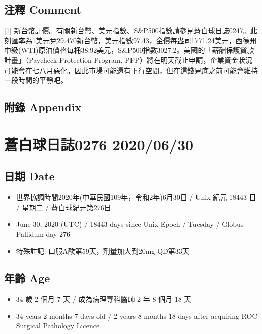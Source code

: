 \documentclass[a5paper, 11pt
]{book}
\providecommand{\tightlist}{%
  \setlength{\itemsep}{0pt}\setlength{\parskip}{0pt}}
\begin{document}
\hypertarget{ux6ce8ux91cb-comment-28}{%
\subsection{注釋 Comment}\label{ux6ce8ux91cb-comment-28}}

{[}1{]}
新台幣計價。有關新台幣、美元指數、S\&P500指數請參見蒼白球日誌0247。此刻匯率為1美元兌29.470新台幣，美元指數97.43，金價每盎司1771.24美元，西德州中級(WTI)原油價格每桶38.92美元，S\&P500指數3027.2。美國的「薪酬保護貸款計畫」（Paycheck
Protection Program,
PPP）將在明天截止申請，企業資金狀況可能會在七八月惡化，因此市場可能還有下行空間，但在這錢見底之前可能會維持一段時間的平靜吧。

\hypertarget{ux9644ux9304-appendix-28}{%
\subsection{附錄 Appendix}\label{ux9644ux9304-appendix-28}}

\hypertarget{ux84bcux767dux7403ux65e5ux8a8c0276-20200630}{%
\section{蒼白球日誌0276
2020/06/30}\label{ux84bcux767dux7403ux65e5ux8a8c0276-20200630}}

\hypertarget{ux65e5ux671f-date-29}{%
\subsection{日期 Date}\label{ux65e5ux671f-date-29}}

\begin{itemize}
\tightlist
\item
  世界協調時間2020年(中華民國109年，令和2年)6月30日 / Unix 紀元 18443 日
  / 星期二 / 蒼白球紀元第276日
\item
  June 30, 2020 (UTC) / 18443 days since Unix Epoch / Tuesday / Globus
  Pallidum day 276
\item
  特殊註記: 口服A酸第59天，劑量加大到20mg QD第33天
\end{itemize}

\hypertarget{ux5e74ux9f61-age-29}{%
\subsection{年齡 Age}\label{ux5e74ux9f61-age-29}}

\begin{itemize}
\tightlist
\item
  34 歲 2 個月 7 天 / 成為病理專科醫師 2 年 8 個月 18 天
\item
  34 years 2 months 7 days old / 2 years 8 months 18 days after
  acquiring ROC Surgical Pathology Licence
\end{itemize}
\end{document}
